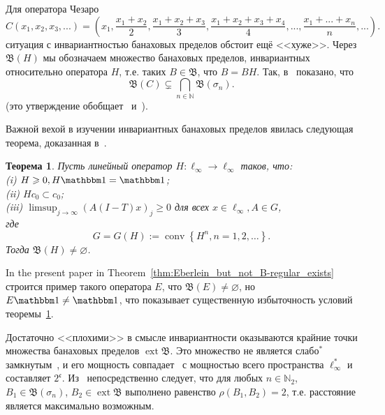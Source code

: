 \documentclass[a4paper,14pt]{article} %
\DeclareMathOperator{\ext}{ext}
\newcommand{\N}{\ensuremath{\mathbb{N}}}
\newcommand{\B}{\ensuremath{\mathfrak{B}}}
\newcommand{\one}{\ensuremath{\mathbbm 1}}
\theoremstyle{plain}
\newtheorem{theorem}[lemma]{Теорема}
\begin{document}
Для оператора Чезаро
\begin{equation}
	C (x_1, x_2, x_3, ...) = \left(
	x_1,
	\dfrac{x_1+x_2}2,
	\dfrac{x_1+x_2 + x_3}3,
	\dfrac{x_1+x_2+x_3+x_4}4,
	...,
	\dfrac{x_1+...+x_n}n,
	...\right)
	.
\end{equation}
ситуация с инвариантностью банаховых пределов обстоит ещё <<хуже>>.
Через $\B(H)$ мы обозначаем множество банаховых пределов,
инвариантных относительно оператора $H$,
т.е. таких $B\in \B$, что $B=BH$.
Так, в~\cite[\S2, Theorem 4]{semenov2020dilation} показано, что
\begin{equation}
	\label{eq:B_C_subsetneq_B_sigma_n}
	\B(C) \subsetneq \bigcap_{n\in \N}\B(\sigma_n)
	.
\end{equation}
(это утверждение обобщает~\cite[Theorem 3]{semenov2020invariant_noncommutative}
и~\cite[Theorem 4.8]{ASSU4}).

Важной вехой в изучении инвариантных банаховых пределов явилась следующая теорема,
доказанная в~\cite[\S2]{Semenov2010invariant}.

\begin{theorem}
	\label{thm:Semenov_Sukochev_conditions}
	Пусть линейный оператор $H:\ell_\infty\to\ell_\infty$ таков, что:
	\\(i)   $H \geqslant 0, H \one=\one$;
	\\(ii)  $H c_0 \subset c_0$;
	\\(iii) $\limsup _{j \rightarrow \infty}(A(I-T) x)_j \geqslant 0$ для всех $x \in \ell_{\infty}, A \in G$,
	\\где
	\begin{equation}
		G=G(H):=\operatorname{conv}\left\{H^n, n=1,2, \ldots\right\}
		.
	\end{equation}
	Тогда $\B(H) \ne\varnothing$.
\end{theorem}

In the present paper in Theorem~\ref{thm:Eberlein_but_not_B-regular_exists}
строится пример такого оператора $E$, что $\B(E)\ne\varnothing$,
но $E\one \ne \one$, что показывает существенную избыточность условий теоремы~\ref{thm:Semenov_Sukochev_conditions}.


Достаточно <<плохими>> в смысле инвариантности оказываются крайние точки множества банаховых пределов $\ext \B$.
Это множество не является слабо$^*$ замкнутым~\cite{Nillsen,Talagrand},
и его мощность совпадает~\cite{Chou} с мощностью всего пространства $\ell_\infty^*$
и составляет $2^{\mathfrak c}$.
Из~\cite[Corollary 6]{semenov2020dilation} непосредственно следует, что для любых
$n\in\N_2$, $B_1 \in \B(\sigma_n)$, $B_2 \in \ext\B$ выполнено равенство
$\rho(B_1,B_2) = 2$, т.е. расстояние является максимально возможным.
\end{document}
